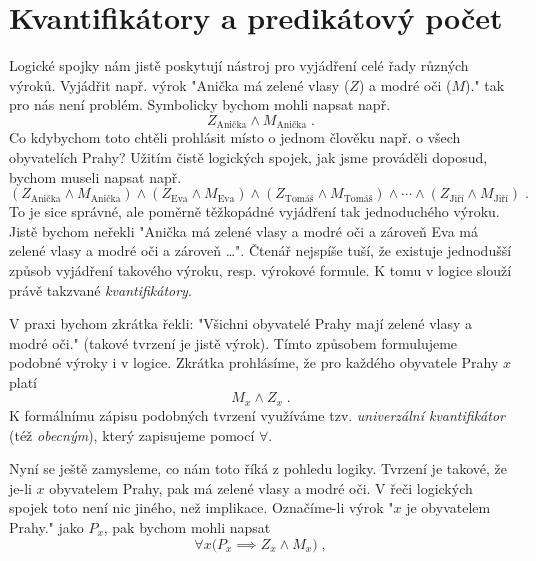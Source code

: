 \section{Kvantifikátory a predikátový počet}\label{sec:kvantifikatory_a_pred_pocet}

Logické spojky nám jistě poskytují nástroj pro vyjádření celé řady různých výroků. Vyjádřit např. výrok "Anička má zelené vlasy ($Z$) a modré oči ($M$)." tak pro nás není problém. Symbolicky bychom mohli napsat např.
\begin{equation*}
    Z_{\text{Anička}} \land M_{\text{Anička}}\; .
\end{equation*}
Co kdybychom toto chtěli prohlásit místo o jednom člověku např. o všech obyvatelích Prahy? Užitím čistě logických spojek, jak jsme prováděli doposud, bychom museli napsat např.
\begin{equation*}
    (Z_{\text{Anička}} \land M_{\text{Anička}}) \land (Z_{\text{Eva}} \land M_{\text{Eva}}) \land (Z_{\text{Tomáš}} \land M_{\text{Tomáš}}) \land \cdots \land (Z_{\text{Jiří}} \land M_{\text{Jiří}})\; .
\end{equation*}
To je sice správné, ale poměrně těžkopádné vyjádření tak jednoduchého výroku. Jistě bychom neřekli "Anička má zelené vlasy a modré oči a zároveň Eva má zelené vlasy a modré oči a zároveň \dots". Čtenář nejspíše tuší, že existuje jednodušší způsob vyjádření takového výroku, resp. výrokové formule. K tomu v logice slouží právě takzvané \emph{kvantifikátory}.\par
V praxi bychom zkrátka řekli: "Všichni obyvatelé Prahy mají zelené vlasy a modré oči." (takové tvrzení je jistě výrok). Tímto způsobem formulujeme podobné výroky i v logice. Zkrátka prohlásíme, že pro každého obyvatele Prahy $x$ platí
\begin{equation*}
    M_x \land Z_x\; .
\end{equation*}
K formálnímu zápisu podobných tvrzení využíváme tzv. \emph{univerzální kvantifikátor} (též \emph{obecným}), který zapisujeme pomocí $\forall$.\par
Nyní se ještě zamysleme, co nám toto říká z pohledu logiky. Tvrzení je takové, že je-li $x$ obyvatelem Prahy, pak má zelené vlasy a modré oči. V řeči logických spojek toto není nic jiného, než implikace. Označíme-li výrok "$x$ je obyvatelem Prahy." jako $P_x$, pak bychom mohli napsat
\begin{equation}\label{eq:univ_kvatifikator_priklad}
    \forall x \big(P_x \implies Z_x \land M_x\big)\; ,
\end{equation}
